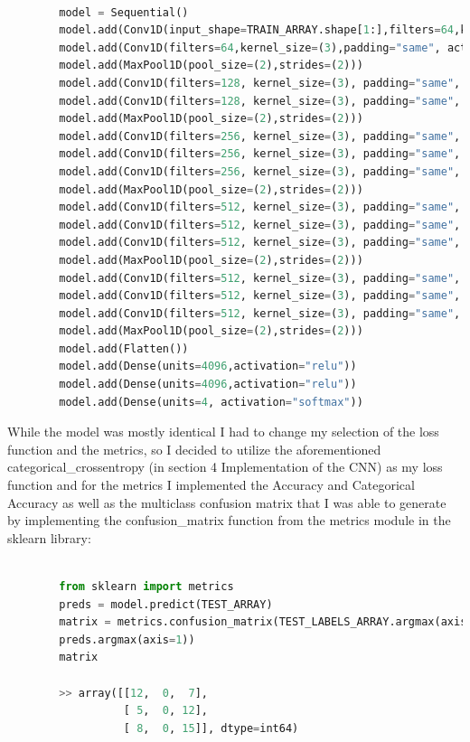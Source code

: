\documentclass[12pt, a4paper]{article}
\begin{document}
	\begin{lstlisting}[language=Python]
		
		model = Sequential()
		model.add(Conv1D(input_shape=TRAIN_ARRAY.shape[1:],filters=64,kernel_size=(3),padding="same", activation="relu"))
		model.add(Conv1D(filters=64,kernel_size=(3),padding="same", activation="relu"))
		model.add(MaxPool1D(pool_size=(2),strides=(2)))
		model.add(Conv1D(filters=128, kernel_size=(3), padding="same", activation="relu"))
		model.add(Conv1D(filters=128, kernel_size=(3), padding="same", activation="relu"))
		model.add(MaxPool1D(pool_size=(2),strides=(2)))
		model.add(Conv1D(filters=256, kernel_size=(3), padding="same", activation="relu"))
		model.add(Conv1D(filters=256, kernel_size=(3), padding="same", activation="relu"))
		model.add(Conv1D(filters=256, kernel_size=(3), padding="same", activation="relu"))
		model.add(MaxPool1D(pool_size=(2),strides=(2)))
		model.add(Conv1D(filters=512, kernel_size=(3), padding="same", activation="relu"))
		model.add(Conv1D(filters=512, kernel_size=(3), padding="same", activation="relu"))
		model.add(Conv1D(filters=512, kernel_size=(3), padding="same", activation="relu"))
		model.add(MaxPool1D(pool_size=(2),strides=(2)))
		model.add(Conv1D(filters=512, kernel_size=(3), padding="same", activation="relu"))
		model.add(Conv1D(filters=512, kernel_size=(3), padding="same", activation="relu"))
		model.add(Conv1D(filters=512, kernel_size=(3), padding="same", activation="relu"))
		model.add(MaxPool1D(pool_size=(2),strides=(2)))
		model.add(Flatten())
		model.add(Dense(units=4096,activation="relu"))
		model.add(Dense(units=4096,activation="relu"))
		model.add(Dense(units=4, activation="softmax"))
	\end{lstlisting}

		\vspace{10mm}

	While the model was mostly identical I had to change my selection of the loss function and the metrics, so I decided to utilize the aforementioned categorical\_crossentropy  (in section 4 Implementation of the CNN) as my loss function and for the metrics I implemented the Accuracy and Categorical Accuracy as well as the multiclass confusion matrix that I was able to generate by implementing the confusion\_matrix function from the metrics module in the sklearn library:
	
		\clearpage
	
	\begin{lstlisting}[language=Python]
		
		from sklearn import metrics
		preds = model.predict(TEST_ARRAY)
		matrix = metrics.confusion_matrix(TEST_LABELS_ARRAY.argmax(axis=1),
		preds.argmax(axis=1))
		matrix
		
		>> array([[12,  0,  7],
				  [ 5,  0, 12],
				  [ 8,  0, 15]], dtype=int64)
				  
	 \end{lstlisting}
 
\end{document}
